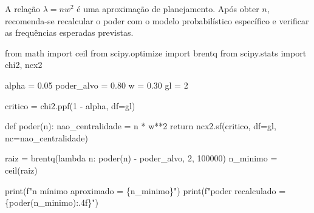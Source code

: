 \documentclass[
  letterpaper,
  DIV=11,
  numbers=noendperiod]{scrreprt}
\newenvironment{Shaded}{\begin{snugshade}}{\end{snugshade}}
\newcommand{\BuiltInTok}[1]{\textcolor[rgb]{0.00,0.23,0.31}{#1}}
\newcommand{\ControlFlowTok}[1]{\textcolor[rgb]{0.00,0.23,0.31}{#1}}
\newcommand{\DecValTok}[1]{\textcolor[rgb]{0.68,0.00,0.00}{#1}}
\newcommand{\FloatTok}[1]{\textcolor[rgb]{0.68,0.00,0.00}{#1}}
\newcommand{\ImportTok}[1]{\textcolor[rgb]{0.00,0.46,0.62}{#1}}
\newcommand{\KeywordTok}[1]{\textcolor[rgb]{0.00,0.23,0.31}{#1}}
\newcommand{\NormalTok}[1]{\textcolor[rgb]{0.00,0.23,0.31}{#1}}
\newcommand{\OperatorTok}[1]{\textcolor[rgb]{0.37,0.37,0.37}{#1}}
\newcommand{\SpecialCharTok}[1]{\textcolor[rgb]{0.37,0.37,0.37}{#1}}
\newcommand{\SpecialStringTok}[1]{\textcolor[rgb]{0.13,0.47,0.30}{#1}}
\begin{document}
\begin{tcolorbox}[enhanced jigsaw, colback=white, leftrule=.75mm, colbacktitle=quarto-callout-note-color!10!white, breakable, titlerule=0mm, bottomtitle=1mm, title=\textcolor{quarto-callout-note-color}{\faInfo}\hspace{0.5em}{Observação bibliográfica}, colframe=quarto-callout-note-color-frame, toprule=.15mm, opacityback=0, bottomrule=.15mm, opacitybacktitle=0.6, arc=.35mm, toptitle=1mm, rightrule=.15mm, coltitle=black, left=2mm]

A relação \(\lambda=nw^2\) é uma aproximação de planejamento. Após obter
\(n\), recomenda-se recalcular o poder com o modelo probabilístico
específico e verificar as frequências esperadas previstas.

\end{tcolorbox}

\begin{Shaded}
\begin{Highlighting}[]
\ImportTok{from}\NormalTok{ math }\ImportTok{import}\NormalTok{ ceil}
\ImportTok{from}\NormalTok{ scipy.optimize }\ImportTok{import}\NormalTok{ brentq}
\ImportTok{from}\NormalTok{ scipy.stats }\ImportTok{import}\NormalTok{ chi2, ncx2}

\NormalTok{alpha }\OperatorTok{=} \FloatTok{0.05}
\NormalTok{poder\_alvo }\OperatorTok{=} \FloatTok{0.80}
\NormalTok{w }\OperatorTok{=} \FloatTok{0.30}
\NormalTok{gl }\OperatorTok{=} \DecValTok{2}

\NormalTok{critico }\OperatorTok{=}\NormalTok{ chi2.ppf(}\DecValTok{1} \OperatorTok{{-}}\NormalTok{ alpha, df}\OperatorTok{=}\NormalTok{gl)}

\KeywordTok{def}\NormalTok{ poder(n):}
\NormalTok{    nao\_centralidade }\OperatorTok{=}\NormalTok{ n }\OperatorTok{*}\NormalTok{ w}\OperatorTok{**}\DecValTok{2}
    \ControlFlowTok{return}\NormalTok{ ncx2.sf(critico, df}\OperatorTok{=}\NormalTok{gl, nc}\OperatorTok{=}\NormalTok{nao\_centralidade)}

\NormalTok{raiz }\OperatorTok{=}\NormalTok{ brentq(}\KeywordTok{lambda}\NormalTok{ n: poder(n) }\OperatorTok{{-}}\NormalTok{ poder\_alvo, }\DecValTok{2}\NormalTok{, }\DecValTok{100000}\NormalTok{)}
\NormalTok{n\_minimo }\OperatorTok{=}\NormalTok{ ceil(raiz)}

\BuiltInTok{print}\NormalTok{(}\SpecialStringTok{f"n mínimo aproximado = }\SpecialCharTok{\{}\NormalTok{n\_minimo}\SpecialCharTok{\}}\SpecialStringTok{"}\NormalTok{)}
\BuiltInTok{print}\NormalTok{(}\SpecialStringTok{f"poder recalculado = }\SpecialCharTok{\{}\NormalTok{poder(n\_minimo)}\SpecialCharTok{:.4f\}}\SpecialStringTok{"}\NormalTok{)}
\end{Highlighting}
\end{Shaded}
\end{document}

